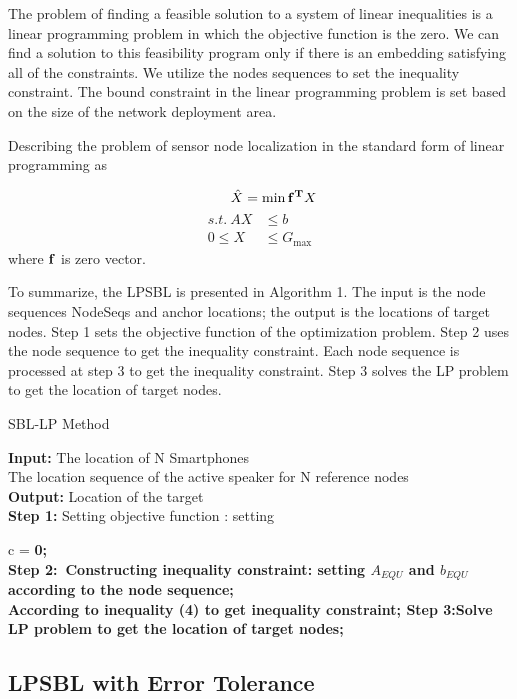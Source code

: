 The problem of finding a feasible solution
to a system of linear inequalities is a linear programming
problem in which the objective function is the zero. We
can find a solution to this feasibility program only if there
is an embedding satisfying all of the constraints. 
We utilize the nodes sequences to set the inequality constraint. The bound
constraint in the linear programming problem is set based
on the size of the network deployment area.

Describing the problem of sensor node localization in the standard form of linear programming as

 \begin{equation} \label{6}
 \quad \quad \hat X = \min {\bf{f}^T}X
  \end{equation}
\begin{align*}
 s.t. \   {A}X &\le {b} \\
       0 \le X & \le {G_{\max }}
\end{align*}
where $\bf{f}$ is zero vector.

To summarize, the LPSBL is presented in Algorithm
1. The input is the node sequences NodeSeqs and anchor locations; the output is the
locations of target nodes. Step 1 sets the objective function
of the optimization problem. Step 2 uses the node sequence
to get the inequality constraint. Each node sequence
is processed at step 3 to get the inequality constraint. Step 3
solves the LP problem to get the location of target nodes.
\begin{algorithm}
\caption{SBL-LP Method}
\textbf{Input:} The location of N Smartphones \\
\quad \quad \quad The location sequence of the active speaker for N reference nodes \\
\textbf{Output:} Location of the target\\

\textbf{Step 1:}  Setting objective function : setting

c = \bf {0}; \\

\textbf{Step 2:}\ Constructing inequality constraint: setting ${A_{EQU}}$ and ${b_{EQU}}$ according to the node sequence;\\
{
{
According to inequality (4) to get inequality constraint;
}
}
\textbf{Step 3:}Solve LP problem to get the location of  target nodes; 
\end{algorithm}


\subsection{LPSBL with Error Tolerance }

